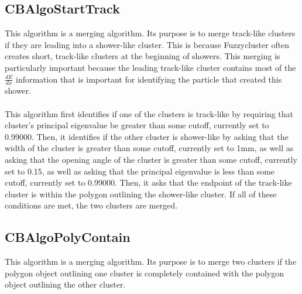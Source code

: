 \documentclass{article}
\begin{document}
\subsection{CBAlgoStartTrack}\label{sec:CBAlgoStartTrack}
This algorithm is a merging algorithm. Its purpose is to merge track-like clusters if they are leading into a shower-like cluster. This is because Fuzzycluster often creates short, track-like clusters at the beginning of showers. This merging is particularly important because the leading track-like cluster contains most of the $\frac{dE}{dx}$ information that is important for identifying the particle that created this shower.\\\\
This algorithm first identifies if one of the clusters is track-like by requiring that cluster's principal eigenvalue be greater than some cutoff, currently set to 0.99000. Then, it identifies if the other cluster is shower-like by asking that the width of the cluster is greater than some cutoff, currently set to 1mm, as well as asking that the opening angle of the cluster is greater than some cutoff, currently set to 0.15, as well as asking that the principal eigenvalue is less than some cutoff, currently set to 0.99000. Then, it asks that the endpoint of the track-like cluster is within the polygon outlining the shower-like cluster. If all of these conditions are met, the two clusters are merged.

\subsection{CBAlgoPolyContain}\label{sec:CBAlgoPolyContain}
This algorithm is a merging algorithm. Its purpose is to merge two clusters if the polygon object outlining one cluster is completely contained with the polygon object outlining the other cluster.

\end{document}
